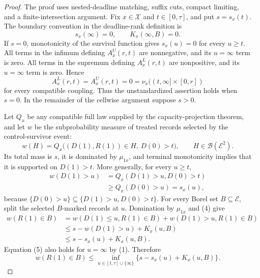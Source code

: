 \documentclass{article}
\begin{document}
\begin{proof}
The proof uses nested-deadline matching, suffix cuts, compact limiting, and a finite-intersection argument.  Fix \(x\in\mathcal X\) and \(t\in[0,\tau]\), and put \(s=s_x(t)\).  The boundary convention in the deadline-rank definition is
\[
s_x(\infty)=0,\qquad K_x(\infty,B)=0. \tag{1}
\]
If \(s=0\), monotonicity of the survival function gives \(s_x(u)=0\) for every \(u\geq t\).  All terms in the infimum defining \(A_x^U(r,t)\) are nonnegative, and its \(u=\infty\) term is zero.  All terms in the supremum defining \(A_x^L(r,t)\) are nonpositive, and its \(u=\infty\) term is zero.  Hence
\[
A_x^L(r,t)=A_x^U(r,t)=0
=\nu_x((t,\infty]\times[0,r]) \tag{2}
\]
for every compatible coupling.  Thus the unstandardized assertion holds when \(s=0\).  In the remainder of the cellwise argument suppose \(s>0\).

Let \(Q_x\) be any compatible full law supplied by the capacity-projection theorem, and let \(w\) be the subprobability measure of treated records selected by the control-survivor event:
\[
w(H)=Q_x\bigl((D(1),R(1))\in H,\ D(0)>t\bigr),
\qquad H\in\mathcal B(\mathcal E^2). \tag{3}
\]
Its total mass is \(s\), it is dominated by \(\mu_{1x}\), and terminal monotonicity implies that it is supported on \(D(1)>t\).  More generally, for every \(u\geq t\),
\[
\begin{aligned}
w(D(1)>u)
&=Q_x(D(1)>u,D(0)>t)\\
&\geq Q_x(D(0)>u)
=s_x(u),
\end{aligned} \tag{4}
\]
because \(\{D(0)>u\}\subseteq\{D(1)>u,D(0)>t\}\).  For every Borel set \(B\subseteq\mathcal E\), split the selected \(B\)-marked records at \(u\).  Domination by \(\mu_{1x}\) and (4) give
\[
\begin{aligned}
w(R(1)\in B)
&=w(D(1)\leq u,R(1)\in B)+w(D(1)>u,R(1)\in B)\\
&\leq s-w(D(1)>u)+K_x(u,B)\\
&\leq s-s_x(u)+K_x(u,B). 
\end{aligned} \tag{5}
\]
Equation (5) also holds for \(u=\infty\) by (1).  Therefore
\[
w(R(1)\in B)
\leq \inf_{u\in[t,\tau]\cup\{\infty\}}
\{s-s_x(u)+K_x(u,B)\}. \tag{6}
\]


\end{proof}
\end{document}
